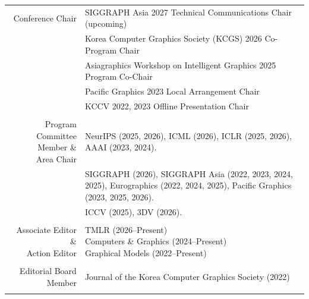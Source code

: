 \documentclass[letterpaper,10pt]{article} %
\begin{document}
\begin{longtable}{r|p{11cm}}
Conference Chair & SIGGRAPH Asia 2027 Technical Communications Chair (upcoming)\\
& Korea Computer Graphics Society (KCGS) 2026 Co-Program Chair\\
& Asiagraphics Workshop on Intelligent Graphics 2025 Program Co-Chair\\
& Pacific Graphics 2023 Local Arrangement Chair\\
& KCCV 2022, 2023 Offline Presentation Chair\\
& \\
\makecell[tr]{Program Committee Member \&\\Area Chair} &
NeurIPS (2025, 2026), ICML (2026), ICLR (2025, 2026), AAAI (2023, 2024).\\
& SIGGRAPH (2026), SIGGRAPH Asia (2022, 2023, 2024, 2025), Eurographics (2022, 2024, 2025), Pacific Graphics (2023, 2025, 2026).\\
& ICCV (2025), 3DV (2026).\\
& \\
\makecell[tr]{Associate Editor \&\\Action Editor} & \parbox[t]{11cm}{TMLR (2026--Present)\\
Computers \& Graphics (2024--Present)\\
Graphical Models (2022--Present)}\\
& \\
Editorial Board Member & Journal of the Korea Computer Graphics Society (2022)\\
& \\

\end{longtable}
\end{document}
